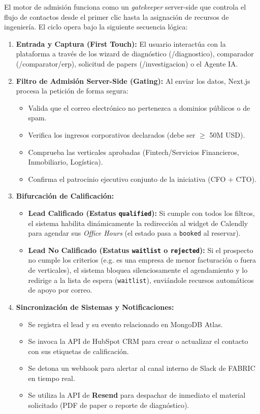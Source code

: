 \documentclass[11pt,letterpaper]{article}
\begin{document}
El motor de admisión funciona como un \emph{gatekeeper} server-side que controla el flujo de contactos desde el primer clic hasta la asignación de recursos de ingeniería. El ciclo opera bajo la siguiente secuencia lógica:

\begin{enumerate}
\item \textbf{Entrada y Captura (First Touch):} El usuario interactúa con la plataforma a través de los wizard de diagnóstico (/diagnostico), comparador (/comparator/erp), solicitud de papers (/investigacion) o el Agente IA.
\item \textbf{Filtro de Admisión Server-Side (Gating):} Al enviar los datos, Next.js procesa la petición de forma segura:
  \begin{itemize}
  \item Valida que el correo electrónico no pertenezca a dominios públicos o de spam.
  \item Verifica los ingresos corporativos declarados (debe ser $\ge$ 50M USD).
  \item Comprueba las verticales aprobadas (Fintech/Servicios Financieros, Inmobiliario, Logística).
  \item Confirma el patrocinio ejecutivo conjunto de la iniciativa (CFO + CTO).
  \end{itemize}
\item \textbf{Bifurcación de Calificación:}
  \begin{itemize}
    \item \textbf{Lead Calificado (Estatus \texttt{qualified}):} Si cumple con todos los filtros, el sistema habilita dinámicamente la redirección al widget de Calendly para agendar sus \emph{Office Hours} (el estado pasa a \texttt{booked} al reservar).
    \item \textbf{Lead No Calificado (Estatus \texttt{waitlist} o \texttt{rejected}):} Si el prospecto no cumple los criterios (e.g. es una empresa de menor facturación o fuera de verticales), el sistema bloquea silenciosamente el agendamiento y lo redirige a la lista de espera (\texttt{waitlist}), enviándole recursos automáticos de apoyo por correo.
  \end{itemize}
\item \textbf{Sincronización de Sistemas y Notificaciones:}
  \begin{itemize}
  \item Se registra el lead y su evento relacionado en MongoDB Atlas.
  \item Se invoca la API de HubSpot CRM para crear o actualizar el contacto con sus etiquetas de calificación.
  \item Se detona un webhook para alertar al canal interno de Slack de FABRIC en tiempo real.
  \item Se utiliza la API de \textbf{Resend} para despachar de inmediato el material solicitado (PDF de paper o reporte de diagnóstico).
  \end{itemize}
\end{enumerate}
\end{document}
